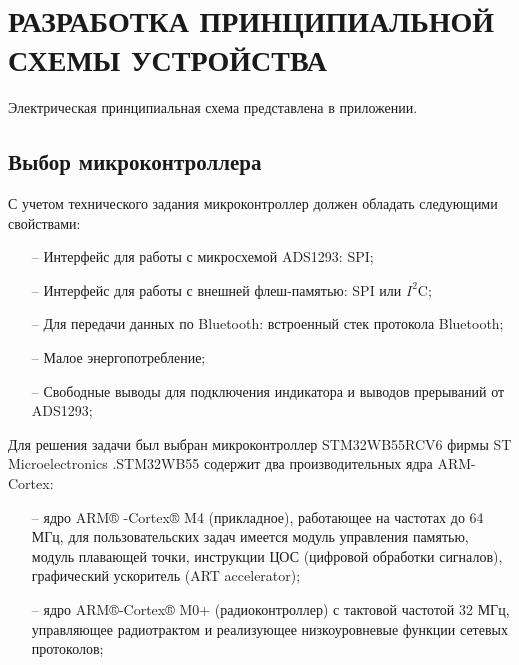 \begin{sloppypar} %
\newpage %
\section{РАЗРАБОТКА ПРИНЦИПИАЛЬНОЙ СХЕМЫ УСТРОЙСТВА} %
Электрическая принципиальная схема представлена в приложении.

 


\subsection{Выбор микроконтроллера}
С учетом технического задания микроконтроллер должен обладать следующими свойствами:
\begin{onehalfspace}
	\begin{itemize}
		\item[--]Интерфейс для работы с микросхемой ADS1293: SPI;
		\item[--]Интерфейс для работы с внешней флеш-памятью: SPI или $I^2$C;
		\item[--]Для передачи данных по Bluetooth: встроенный стек протокола Bluetooth;
		\item[--]Малое энергопотребление;
		\item[--]Свободные выводы для подключения индикатора и выводов прерываний от ADS1293;
	\end{itemize}
\end{onehalfspace}

Для решения задачи был выбран микроконтроллер STM32WB55RCV6 фирмы ST Microelectronics \cite {STM}.STM32WB55 содержит два производительных ядра ARM-Cortex:
\begin{onehalfspace}
	\begin{itemize}
		\item[--] ядро ARM® -Cortex® M4 (прикладное), работающее на частотах до 64 МГц, для пользовательских задач имеется модуль управления памятью, модуль плавающей точки, инструкции ЦОС (цифровой обработки сигналов), графический ускоритель (ART accelerator);
		\item[--] ядро ARM®-Cortex® M0+ (радиоконтроллер) с тактовой частотой 32 МГц, управляющее радиотрактом и реализующее низкоуровневые функции сетевых протоколов;
	\end{itemize}
\end{onehalfspace}


\end{sloppypar}
